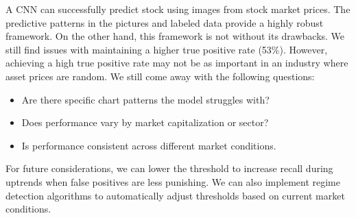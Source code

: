 \documentclass[12pt]{article}
\begin{document}
A CNN can successfully predict stock using images from stock market prices. The predictive patterns in the pictures and labeled data provide a highly robust framework. On the other hand, this framework is not without its drawbacks. We still find issues with maintaining a higher true positive rate (53\%). However, achieving a high true positive rate may not be as important in an industry where asset prices are random. We still come away with the following questions:

\begin{itemize}
	\item Are there specific chart patterns the model struggles with?
	\item Does performance vary by market capitalization or sector?
	\item Is performance consistent across different market conditions.
\end{itemize}
For future considerations, we can lower the threshold to increase recall during uptrends when false positives are less punishing. We can also implement regime detection algorithms to automatically adjust thresholds based on current market conditions.
\end{document}

